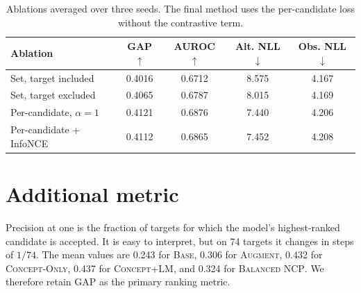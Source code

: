 \documentclass[11pt]{article}
\newcommand{\base}{\textsc{Base}}
\newcommand{\aug}{\textsc{Augment}}
\newcommand{\peq}{\textsc{Concept-Only}}
\newcommand{\pcode}{\textsc{Concept+LM}}
\newcommand{\method}{\textsc{Balanced NCP}}
\begin{document}
\begin{table}[h]
\centering\scriptsize\setlength{\tabcolsep}{2.5pt}
\begin{tabular}{lcccc}
\toprule
Ablation & GAP $\uparrow$ & AUROC $\uparrow$ & Alt. NLL $\downarrow$ & Obs. NLL $\downarrow$ \\
\midrule
Set, target included & 0.4016 & 0.6712 & 8.575 & 4.167 \\
Set, target excluded & 0.4065 & 0.6787 & 8.015 & 4.169 \\
Per-candidate, $\alpha=1$ & 0.4121 & 0.6876 & 7.440 & 4.206 \\
Per-candidate $+$ InfoNCE & 0.4112 & 0.6865 & 7.452 & 4.208 \\
\bottomrule
\end{tabular}
\caption{Ablations averaged over three seeds. The final method uses the
per-candidate loss without the contrastive term.}
\label{tab:ablation}
\end{table}

\section{Additional metric}

Precision at one is the fraction of targets for which the model's highest-ranked
candidate is accepted. It is easy to interpret, but on 74 targets it changes in
steps of $1/74$. The mean values are 0.243 for \base{}, 0.306 for \aug{}, 0.432
for \peq{}, 0.437 for \pcode{}, and 0.324 for \method{}. We therefore retain GAP
as the primary ranking metric.




\end{document}
